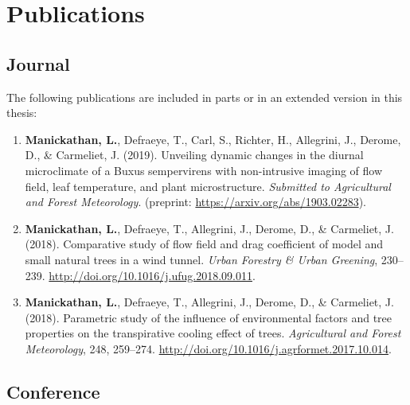\chapter{Publications}

\section*{Journal}

The following publications are included in parts or in an extended version in this thesis:

\begin{enumerate}

	
	\item \textbf{Manickathan, L.}, Defraeye, T., Carl, S., Richter, H., Allegrini, J., Derome, D., \& Carmeliet, J. (2019). Unveiling dynamic changes in the diurnal microclimate of a Buxus sempervirens with non-intrusive imaging of flow field, leaf temperature, and plant microstructure. \textit{Submitted to Agricultural and Forest Meteorology}. (preprint: \url{https://arxiv.org/abs/1903.02283}).
	
	\item \textbf{Manickathan, L.}, Defraeye, T., Allegrini, J., Derome, D., \& Carmeliet, J. (2018). Comparative study of flow field and drag coefficient of model and small natural trees in a wind tunnel. \textit{Urban Forestry \& Urban Greening}, 230–239. \url{http://doi.org/10.1016/j.ufug.2018.09.011}.
	
	\item \textbf{Manickathan, L.}, Defraeye, T., Allegrini, J., Derome, D., \& Carmeliet, J. (2018). Parametric study of the influence of environmental factors and tree properties on the transpirative cooling effect of trees. \textit{Agricultural and Forest Meteorology}, 248, 259–274. \url{http://doi.org/10.1016/j.agrformet.2017.10.014}.


\end{enumerate}

\bigskip

\section*{Conference}


